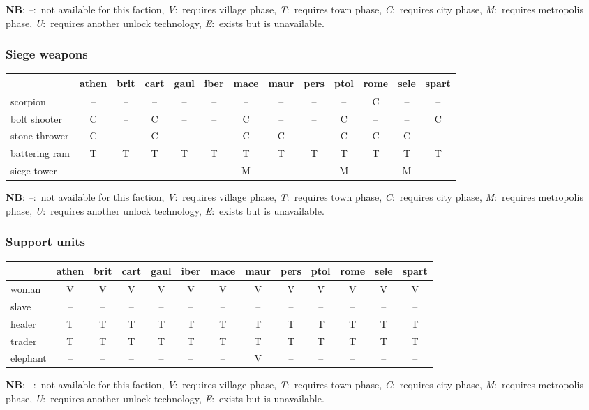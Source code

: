 \documentclass{article}
\newcommand{\legenda}{
\textbf{NB}:
\emph{--}:~not available for this faction, 
\emph{V}:~requires village phase, 
\emph{T}:~requires town phase, 
\emph{C}:~requires city phase, 
\emph{M}:~requires metropolis phase, 
\emph{U}:~requires another unlock technology, 
\emph{E}:~exists but is unavailable.
}
\begin{document}
\legenda


\subsubsection{Siege weapons}
\begin{tabular}{l|cccc|cccc|cccc}
 & athen & brit & cart & gaul & iber & mace & maur & pers & ptol & rome & sele & spart \\
\hline
scorpion      & -- & -- & -- & -- & -- & -- & -- & -- & -- & C  & -- & -- \\
bolt shooter  & C  & -- & C  & -- & -- & C  & -- & -- & C  & -- & -- & C  \\
stone thrower & C  & -- & C  & -- & -- & C  & C  & -- & C  & C  & C  & -- \\
battering ram & T  & T  & T  & T  & T  & T  & T  & T  & T  & T  & T  & T  \\
siege tower   & -- & -- & -- & -- & -- & M  & -- & -- & M  & -- & M  & -- \\
\end{tabular}

\legenda


\subsubsection{Support units}
\begin{tabular}{l|cccc|cccc|cccc}
 & athen & brit & cart & gaul & iber & mace & maur & pers & ptol & rome & sele & spart \\
\hline
woman       & V  & V  & V  & V  & V  & V  & V  & V  & V  & V  & V  & V  \\
slave       & -- & -- & -- & -- & -- & -- & -- & -- & -- & -- & -- & -- \\
healer      & T  & T  & T  & T  & T  & T  & T  & T  & T  & T  & T  & T  \\
trader      & T  & T  & T  & T  & T  & T  & T  & T  & T  & T  & T  & T  \\
elephant    & -- & -- & -- & -- & -- & -- & V  & -- & -- & -- & -- & -- \\
\end{tabular}

\legenda
\end{document}
